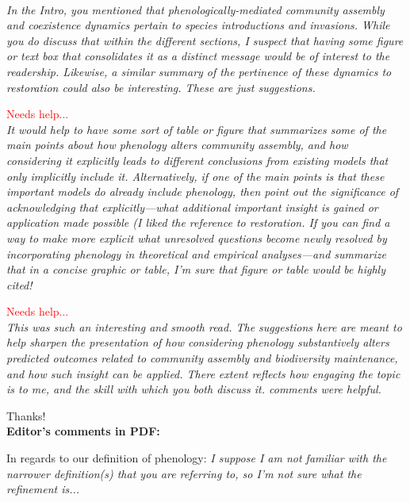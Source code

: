 \documentclass[11pt]{article}
\begin{document}
\textcolor{red}{}\\

\emph{In the Intro, you mentioned that phenologically-mediated community assembly and coexistence dynamics pertain to species introductions and invasions. While you do discuss that within the different sections, I suspect that having some figure or text box that consolidates it as a distinct message would be of interest to the readership. Likewise, a similar summary of the pertinence of these dynamics to restoration could also be interesting. These are just suggestions.}

\textcolor{red}{Needs help...}\\

\emph{It would help to have some sort of table or figure that summarizes some of the main points about how phenology alters community assembly, and how considering it explicitly leads to different conclusions from existing models that only implicitly include it. Alternatively, if one of the main points is that these important models do already include phenology, then point out the significance of acknowledging that explicitly—what additional important insight is gained or application made possible (I liked the reference to restoration. If you can find a way to make more explicit what unresolved questions become newly resolved by incorporating phenology in theoretical and empirical analyses—and summarize that in a concise graphic or table, I’m sure that figure or table would be highly cited!}

\textcolor{red}{Needs help...}\\

\emph{This was such an interesting and smooth read. The suggestions here are meant to help sharpen the presentation of how considering phenology substantively alters predicted outcomes related to community assembly and biodiversity maintenance, and how such insight
can be applied. There extent reflects how engaging the topic is to me, and the skill with which you both discuss it. comments were helpful.}

Thanks!\\

{\bf Editor's comments in PDF:} 

In regards to our definition of phenology: \emph{I suppose I am not familiar with the narrower definition(s) that you are referring to, so I'm not sure what the refinement is... }
\end{document}
